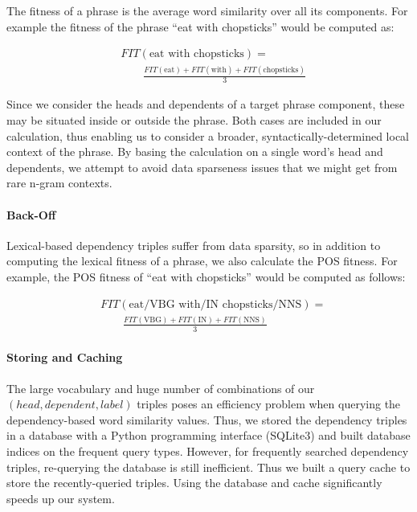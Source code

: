 \documentclass[11pt,a4paper]{article}
\begin{document}
The fitness of a phrase is the average word similarity over all its components. For example the fitness of the phrase ``eat with chopsticks'' would be computed as:

\begin{align}
& FIT(\mbox{eat with chopsticks}) = \nonumber \\
 & \qquad \frac{FIT(\mbox{eat}) + FIT(\mbox{with}) + FIT(\mbox{chopsticks})}{3}
\end{align}

Since we consider the heads and dependents of a target phrase component, these
may be situated  inside or outside the phrase. Both cases are included in our
calculation, thus enabling us to consider a broader, syntactically-determined
local context of the phrase.
By basing the calculation on a single word's head and dependents, we attempt to 
avoid data sparseness issues that we might get from rare n-gram contexts.

\paragraph{Back-Off}
Lexical-based dependency triples suffer from data sparsity, so in addition to computing the lexical fitness of a phrase, we also calculate the POS fitness. For example, the POS fitness of ``eat with chopsticks'' would be computed as follows:

\begin{align}
& FIT(\mbox{eat/VBG with/IN chopsticks/NNS}) = \nonumber \\
 & \qquad \frac{FIT(\mbox{VBG}) + FIT(\mbox{IN}) + FIT(\mbox{NNS})}{3} 
\end{align}



\paragraph{Storing and Caching}
The large vocabulary and huge number of combinations of our $(head, dependent, label)$ triples poses an efficiency problem when querying the dependency-based word similarity values. Thus, we stored the dependency triples in a database with a Python programming interface (SQLite3) and built database indices on the frequent query types. However, for frequently searched dependency triples, re-querying the database is still inefficient. Thus we built a query cache to store the recently-queried triples. Using the database and cache significantly speeds up our system. 
\end{document}
